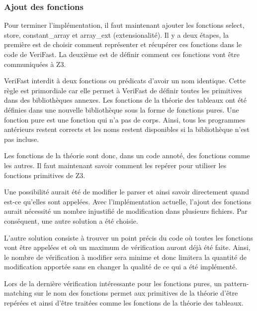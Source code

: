 \documentclass[11pt,openany]{article}
\newcommand{\verifast}{VeriFast}
\begin{document}
		\subsubsection{Ajout des fonctions}
	Pour terminer l'impl\'ementation, il faut maintenant ajouter les fonctions select, store, constant\_array et array\_ext (extensionalit\'e). Il y a deux \'etapes, la premi\`ere est de choisir comment repr\'esenter  et r\'ecup\'erer ces fonctions dans le code de \verifast{}. La deuxi\`eme est de d\'efinir comment ces fonctions vont \^etre communiqu\'ees \`a Z3.\\ \par
		\verifast{} interdit \`a deux fonctions ou pr\'edicats d'avoir un nom identique. Cette r\`egle est primordiale car elle permet \`a \verifast{} de d\'efinir toutes les primitives dans des biblioth\`eques annexes. Les fonctions de la th\'eorie des tableaux ont \'et\'e d\'efinies dans une nouvelle biblioth\`eque sous la forme de fonctions pures. Une fonction pure est une fonction qui n'a pas de corps. Ainsi, tous les programmes ant\'erieurs restent corrects et les noms restent disponibles si la biblioth\`eque n'est pas incluse.\par
		Les fonctions de la th\'eorie sont donc, dans un code annot\'e, des fonctions comme les autres. Il faut maintenant savoir comment les rep\'erer pour utiliser les fonctions primitives de Z3. \par
		Une possibilit\'e aurait \'et\'e de modifier le parser et ainsi savoir directement quand est-ce qu'elles sont appel\'ees. Avec l'impl\'ementation actuelle, l'ajout des fonctions aurait n\'ecessit\'e un nombre injustifi\'e de modification dans plusieurs fichiers. Par cons\'equent, une autre solution a \'et\'e choisie. \par
		L'autre solution consiste \`a trouver un point pr\'ecis du code o\`u toutes les fonctions vont \^etre appel\'ees et o\`u un maximum de v\'erification auront d\'ej\`a \'et\'e faite. Ainsi, le nombre de v\'erification \`a modifier sera minime et donc limitera la quantit\'e de modification apport\'ee sans en changer la qualit\'e de ce qui a \'et\'e impl\'ement\'e.\par
		Lors de la derni\`ere v\'erification int\'eressante pour les fonctions pures, un pattern-matching sur le nom des fonctions permet aux primitives de la th\'eorie d'\^etre rep\'er\'ees et ainsi d'\^etre trait\'ees comme les fonctions de la th\'eorie des tableaux.\\ \par
		
\end{document}
